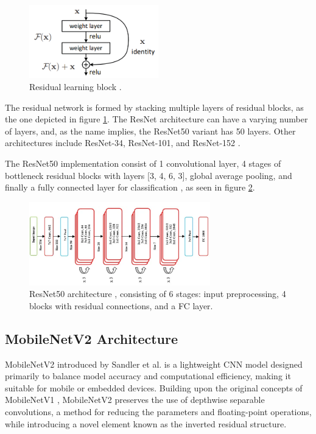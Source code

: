 \begin{figure}[ht]
    \centering
    \includegraphics[width=0.5\textwidth]{Images/res_learn.png} 
    \caption{Residual learning block \cite{he2015deepresiduallearningimage}.}
    \label{fig:res_learning}
\end{figure}

\noindent The residual network is formed by stacking multiple layers of residual blocks, as the one depicted in figure \ref{fig:res_learning}. The ResNet architecture can have a varying number of layers, and, as the name implies, the ResNet50 variant has 50 layers. Other architectures include ResNet-34, ResNet-101, and ResNet-152 \cite{he2016identitymappingsdeepresidual}. 

The ResNet50 implementation consist of 1 convolutional layer, 4 stages of bottleneck residual blocks with layers [3, 4, 6, 3], global average pooling, and finally a fully connected layer for classification \cite{torchvision-resnet}, as seen in figure \ref{fig:resnet50}. 

\begin{figure}[ht]
    \centering
    \includegraphics[width=0.7\textwidth]{Images/resnet50_blocks.png} 
    \caption{ResNet50 architecture \cite{medium_resnet}, consisting of 6 stages: input preprocessing, 4 blocks with residual connections, and a FC layer.}
    \label{fig:resnet50}
\end{figure}


\subsection{MobileNetV2 Architecture}
\label{sec:mobilenet}
MobileNetV2 introduced by Sandler et al. \cite{sandler2018mobilenetv2} is a lightweight CNN model designed primarily to balance model accuracy and computational efficiency, making it suitable for mobile or embedded devices. Building upon the original concepts of MobileNetV1 \cite{howard2017mobilenetsefficientconvolutionalneural}, MobileNetV2 preserves the use of depthwise separable convolutions, a method for reducing the parameters and floating-point operations, while introducing a novel element known as the inverted residual structure. 

